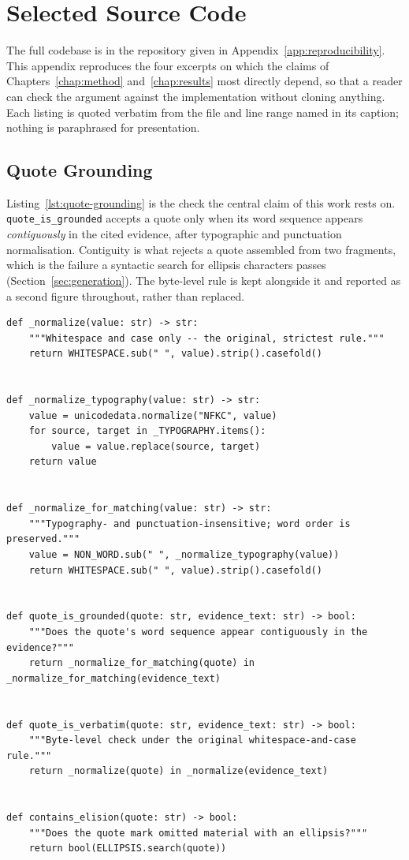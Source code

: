 \chapter{Selected Source Code}
\label{app:code}

The full codebase is in the repository given in
Appendix~\ref{app:reproducibility}. This appendix reproduces the four excerpts
on which the claims of Chapters~\ref{chap:method} and~\ref{chap:results} most
directly depend, so that a reader can check the argument against the
implementation without cloning anything. Each listing is quoted verbatim from
the file and line range named in its caption; nothing is paraphrased for
presentation.

\section{Quote Grounding}

Listing~\ref{lst:quote-grounding} is the check the central claim of this work
rests on. \texttt{quote\_is\_grounded} accepts a quote only when its word
sequence appears \emph{contiguously} in the cited evidence, after typographic
and punctuation normalisation. Contiguity is what rejects a quote assembled
from two fragments, which is the failure a syntactic search for ellipsis
characters passes (Section~\ref{sec:generation}). The byte-level rule is kept
alongside it and reported as a second figure throughout, rather than replaced.

\begin{lstlisting}[style=thesis,caption={The contiguity definition of a verbatim quote, with the byte-level rule retained beside it. Source: \texttt{src/aviation\_rag/generation/verification.py}, lines 60--90.},label={lst:quote-grounding}]
def _normalize(value: str) -> str:
    """Whitespace and case only -- the original, strictest rule."""
    return WHITESPACE.sub(" ", value).strip().casefold()


def _normalize_typography(value: str) -> str:
    value = unicodedata.normalize("NFKC", value)
    for source, target in _TYPOGRAPHY.items():
        value = value.replace(source, target)
    return value


def _normalize_for_matching(value: str) -> str:
    """Typography- and punctuation-insensitive; word order is preserved."""
    value = NON_WORD.sub(" ", _normalize_typography(value))
    return WHITESPACE.sub(" ", value).strip().casefold()


def quote_is_grounded(quote: str, evidence_text: str) -> bool:
    """Does the quote's word sequence appear contiguously in the evidence?"""
    return _normalize_for_matching(quote) in _normalize_for_matching(evidence_text)


def quote_is_verbatim(quote: str, evidence_text: str) -> bool:
    """Byte-level check under the original whitespace-and-case rule."""
    return _normalize(quote) in _normalize(evidence_text)


def contains_elision(quote: str) -> bool:
    """Does the quote mark omitted material with an ellipsis?"""
    return bool(ELLIPSIS.search(quote))
\end{lstlisting}

